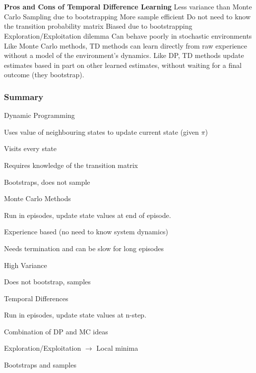 \documentclass[12pt]{article}
\begin{document}
\\\\
\textbf{Pros and Cons of Temporal Difference Learning}
\ulb
\pro Less variance than Monte Carlo Sampling due to bootstrapping
\pro More sample efficient
\pro Do not need to know the transition probability matrix
\con Biased due to bootstrapping
\con Exploration/Exploitation dilemma
\con Can behave poorly in stochastic environments
\ule
Like Monte Carlo methods, TD methods can learn directly from raw experience without a model of the environment's dynamics. Like DP, TD methods update estimates based in part on other learned estimates, without waiting for a final outcome (they bootstrap).

\subsubsection{Summary}
\ulb

\item Dynamic Programming
\ulb
\item Uses value of neighbouring states to update current state (given $\pi$)
\item Visits every state
\item Requires knowledge of the transition matrix
\item Bootstraps, does not sample
\ule

\item Monte Carlo Methods
\ulb
\item Run in episodes, update state values at end of episode.
\item Experience based (no need to know system dynamics)
\item Needs termination and can be slow for long episodes
\item High Variance
\item Does not bootstrap, samples
\ule

\item Temporal Differences
\ulb
\item Run in episodes, update state values at n-step.
\item Combination of DP and MC ideas
\item Exploration/Exploitation $\rightarrow$ Local minima
\item Bootstraps and samples
\ule

\ule
\end{document}
